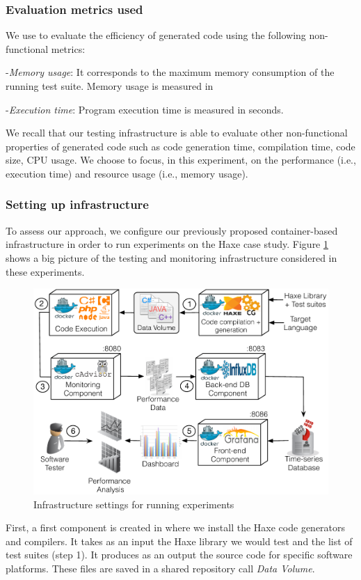 \subsubsection{Evaluation metrics used}
We use to evaluate the efficiency of generated code using the following non-functional metrics:

-\textit{Memory usage}:
It corresponds to the maximum memory consumption of the running test suite. Memory usage is measured in \SI{}{\mega\byte}

-\textit{Execution time}:
Program execution time is measured in seconds.

We recall that our testing infrastructure is able to evaluate other non-functional properties of generated code such as code generation time, compilation time, code size, CPU usage. We choose to focus, in this experiment, on the performance (i.e., execution time) and resource usage (i.e., memory usage).

\subsubsection{Setting up infrastructure}

To assess our approach, we configure our previously proposed container-based infrastructure in order to run experiments on the Haxe case study.
Figure \ref{fig:settingup.pdf} shows a big picture of the testing and monitoring infrastructure considered in these experiments.

\begin{figure}[h]
	\centering
	\includegraphics[width=0.8\linewidth]{chapitre4/fig/settingup.pdf}
	\caption{Infrastructure settings for running experiments}
	\label{fig:settingup.pdf}
\end{figure}

First, a first component is created in where we install the Haxe code generators and compilers. It takes as an input the Haxe library we would test and the list of test suites (step 1). It produces as an output the source code for specific software platforms. These files are saved in a shared repository call \textit{Data Volume}.

